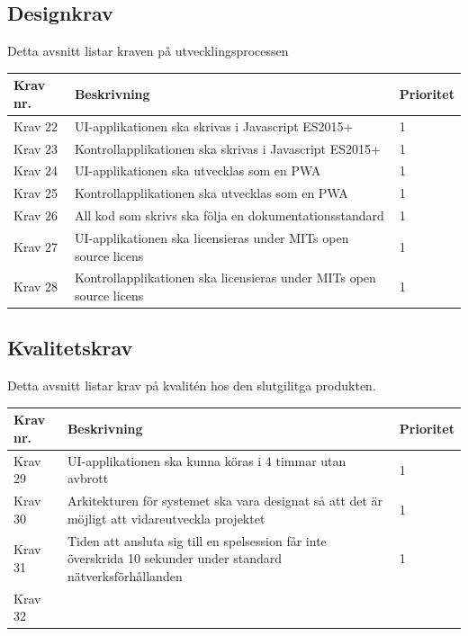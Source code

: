 \documentclass[10pt]{article}
\begin{document}
	\subsection{Designkrav}
	Detta avsnitt listar kraven på utvecklingsprocessen
	
	\begin{tabular}{| p{2cm} | p{8cm} | p{2cm}|}
		\hline
		\textbf{Krav nr.} & \textbf{Beskrivning} & \textbf{Prioritet} \\ \hline
		
		Krav 22 & UI-applikationen ska skrivas i Javascript ES2015+ & 1 \\ \hline
		Krav 23 & Kontrollapplikationen ska skrivas i Javascript ES2015+ & 1 \\ \hline
		Krav 24 & UI-applikationen ska utvecklas som en PWA & 1 \\ \hline
		Krav 25 & Kontrollapplikationen ska utvecklas som en PWA & 1 \\ \hline
		Krav 26 & All kod som skrivs ska följa en dokumentationsstandard & 1 \\ \hline
		Krav 27 & UI-applikationen ska licensieras under MITs open source licens & 1 \\ \hline
		Krav 28 & Kontrollapplikationen ska licensieras under MITs open source licens & 1 \\ \hline
	\end{tabular}

	\subsection{Kvalitetskrav}
	Detta avsnitt listar krav på kvalitén hos den slutgilitga produkten.
	
		\begin{tabular}{|p{2cm}|p{8cm}|p{2cm}|}
		\hline
		\textbf{Krav nr.} & \textbf{Beskrivning} & \textbf{Prioritet} \\ \hline
		Krav 29 & UI-applikationen ska kunna köras i 4 timmar utan avbrott & 1 \\ \hline
		Krav 30 & Arkitekturen för systemet ska vara designat så att det är möjligt att vidareutveckla projektet & 1 \\ \hline
		Krav 31 & Tiden att ansluta sig till en spelsession får inte överskrida 10 sekunder under standard nätverksförhållanden & 1 \\ \hline
		Krav 32 & & \\ \hline
		
	\end{tabular}
	
\pagebreak

\printbibliography
{}
\end{document}

